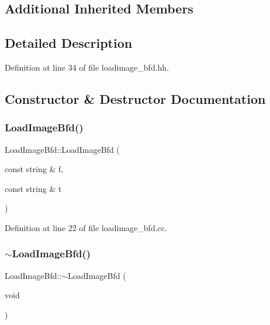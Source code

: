 \subsection*{Additional Inherited Members}


\subsection{Detailed Description}


Definition at line 34 of file loadimage\+\_\+bfd.\+hh.



\subsection{Constructor \& Destructor Documentation}
\mbox{\label{class_load_image_bfd_a3dbf8efbc462647404d8263f2e42b18c}} 
\subsubsection{\texorpdfstring{LoadImageBfd()}{LoadImageBfd()}}
{\footnotesize\ttfamily Load\+Image\+Bfd\+::\+Load\+Image\+Bfd (\begin{DoxyParamCaption}\item[{const string \&}]{f,  }\item[{const string \&}]{t }\end{DoxyParamCaption})}



Definition at line 22 of file loadimage\+\_\+bfd.\+cc.

\mbox{\label{class_load_image_bfd_a449f33ca39e93b36288d2b45c18831d8}} 
\subsubsection{\texorpdfstring{$\sim$LoadImageBfd()}{~LoadImageBfd()}}
{\footnotesize\ttfamily Load\+Image\+Bfd\+::$\sim$\+Load\+Image\+Bfd (\begin{DoxyParamCaption}\item[{void}]{ }\end{DoxyParamCaption})\hspace{0.3cm}{\ttfamily [virtual]}}



